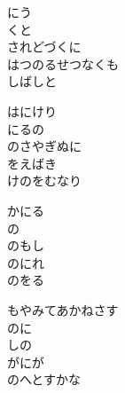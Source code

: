 \documentclass[10pt,b5j]{tarticle} %
\begin{document}
\vspace{1.5em} %
\newcommand{\linespace}{0.5em} %
\newcommand{\blocksize}{0.5\hsize} %
\begin{enumerate} %
    \begin{minipage}[c]{\blocksize}
    
        \vspace{\linespace}
        \item
        にう\\
        くと\\
        されどづくに\\
        はつのるせつなくも\\
        しばしと
        
        \vspace{\linespace}
        \item
        はにけり\\
        にるの\\
        のさやぎぬに\\
        をえばき\\
        けのをむなり
        
        \vspace{\linespace}
        \item
        かにる\\
        の\\
        のもし\\
        のにれ\\
        のをる
        
        \vspace{\linespace}
        \item
        もやみてあかねさす\\
        のに\\
        しの\\
        がにが\\
        のへとすかな
        

\end{minipage}
\end{enumerate}
\end{document}
